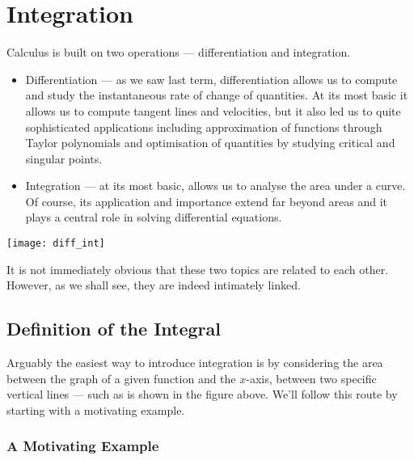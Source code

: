 %
%

\graphicspath{{./figures/integration/}}


\def\showissues{y}
\def\showintremarks{n}


\chapter{Integration} \label{chap integral}
Calculus is built on two operations --- differentiation and integration.

\begin{itemize}
\item Differentiation --- as we saw last term, differentiation allows us to compute and
study the instantaneous rate of change of quantities. At its most basic it
allows us to compute tangent lines and velocities, but it also led us to quite
sophisticated applications including approximation of functions
through Taylor polynomials and optimisation of quantities by studying critical
and singular points.
\item Integration --- at its most basic, allows us to analyse the area under a
curve. Of course, its application and importance extend far beyond areas and it plays a
central role in solving differential equations.
\end{itemize}
\begin{efig}
 \begin{center}
  \texttt{[image: diff\_int]}
 \end{center}
\end{efig}
It is not immediately obvious that these two topics are related to each other.
However, as we shall see, they are indeed intimately linked.
\section{Definition of the Integral}\label{sec:intdef}

Arguably the easiest way to introduce integration is by considering the area between
the graph of a given function and the $x$-axis, between two specific vertical lines ---
such as is shown in the figure above. We'll follow this route by starting with
a motivating example.

\subsection{A Motivating Example}

